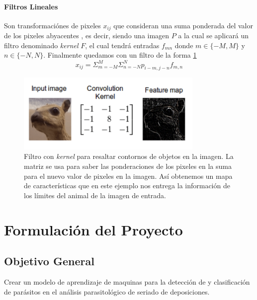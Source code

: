 \documentclass[letter,12pt]{report}
\begin{document}
\subsubsection{Filtros Lineales}
Son transformaciónes de pixeles $x_{ij}$ que consideran una suma ponderada del valor de
los pixeles abyacentes \cite{Conv}, es decir, siendo una imagen $P$ a la cual se  aplicará
un filtro denominado \textit{kernel} $F$, el cual tendrá entradas $f_{mn}$ donde
$m\in\{-M,M\}$ y $n\in\{-N,N\}$. Finalmente quedamos con un filtro de la forma
\ref{fig:kernel}
$$x_{ij}=\Sigma_{m=-M}^M\Sigma_{n=-N}^Np_{i-m,j-n}f_{m,n}$$

\begin{figure}[H]
    \centering
    \includegraphics[width=0.8\textwidth]{kernel}
    \caption{Filtro con \textit{kernel} para resaltar contornos de objetos en la imagen.
    La matriz se usa para saber las ponderaciones de los pixeles en la suma para el nuevo
valor de pixeles en la imagen. Así obtenemos un mapa de características que en este
ejemplo nos entrega la información de los límites del animal de la imagen de entrada.}
    \label{fig:kernel}
\end{figure}


\chapter{Formulación del Proyecto}\label{formulación}

\section{Objetivo General}
Crear un modelo de aprendizaje de maquinas para la detección de y clasificación de
parásitos en el análisis parasitológico de seriado de deposiciones.
\end{document}
